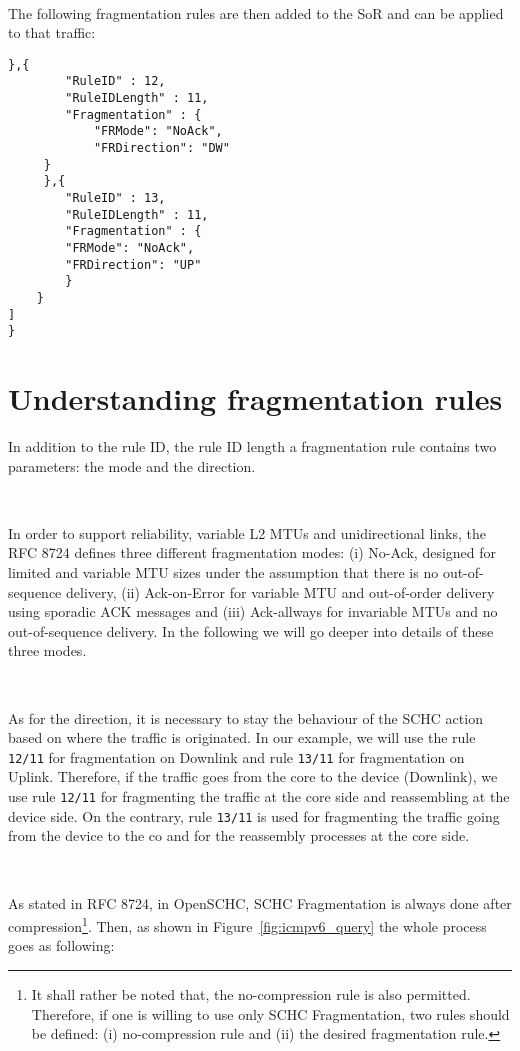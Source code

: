 ~

The following fragmentation rules are then added to the SoR and can be applied to that traffic:

\begin{lstlisting}[caption={Fragmentation Rules in rule icmp2.json}, backgroundcolor=\color{yellow}, basicstyle=\ttfamily\small, label=rule-icmp2]
	 },{
		"RuleID" : 12,
		"RuleIDLength" : 11,
		"Fragmentation" : {
			"FRMode": "NoAck",
			"FRDirection": "DW"
	 }
	 },{	
		"RuleID" : 13,
		"RuleIDLength" : 11,
		"Fragmentation" : {
		"FRMode": "NoAck",
		"FRDirection": "UP"
		} 
    }
]
}
\end{lstlisting}

\section{Understanding fragmentation rules}

In addition to the rule ID, the rule ID length a fragmentation rule contains two  parameters: the mode and the direction.

~

In order to support reliability, variable L2 MTUs and unidirectional links, the RFC 8724 defines three different fragmentation modes: (i) No-Ack, designed for limited and variable MTU sizes under the assumption that there is no out-of-sequence delivery, (ii) Ack-on-Error for variable MTU and out-of-order delivery using sporadic ACK messages and (iii) Ack-allways for invariable MTUs and no out-of-sequence delivery.
In the following we will go deeper into details of these three modes.

~

As for the direction, it is necessary to stay the behaviour of the SCHC action based on where the traffic is originated.
In our example, we will use the rule \texttt{12/11} for fragmentation on Downlink and rule \texttt{13/11} for fragmentation on Uplink.
Therefore, if the traffic goes from the core to the device (Downlink), we use rule \texttt{12/11} for fragmenting the traffic at the core side and reassembling at the device side.
On the contrary, rule \texttt{13/11} is used for fragmenting the traffic going from the device to the co and for the reassembly processes at the core side.

~

As stated in RFC 8724, in OpenSCHC, SCHC Fragmentation is always done after compression\footnote{It shall rather be noted that, the no-compression rule is also permitted. Therefore, if one is willing to use only SCHC Fragmentation, two rules should be defined: (i) no-compression rule and (ii) the desired fragmentation rule.}. 
Then, as shown in Figure~\ref{fig:icmpv6_query} the whole process goes as following:

